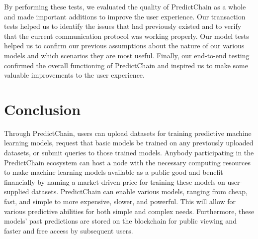\documentclass{ledger}
\begin{document}
By performing these tests, we evaluated the quality of PredictChain as a whole and made important additions to improve the user experience. Our transaction tests helped us to identify the issues that had previously existed and to verify that the current communication protocol was working properly. Our model tests helped us to confirm our previous assumptions about the nature of our various models and which scenarios they are most useful. Finally, our end-to-end testing confirmed the overall functioning of PredictChain and inspired us to make some valuable improvements to the user experience.



\section{Conclusion}

Through PredictChain, users can upload datasets for training predictive machine learning models, request that basic models be trained on any previously uploaded datasets, or submit queries to those trained models. Anybody participating in the PredictChain ecosystem can host a node with the necessary computing resources to make machine learning models available as a public good and benefit financially by naming a market-driven price for training these models on user-supplied datasets. PredictChain can enable various models, ranging from cheap, fast, and simple to more expensive, slower, and powerful. This will allow for various predictive abilities for both simple and complex needs. Furthermore, these models' past predictions are stored on the blockchain for public viewing and faster and free access by subsequent users.
\end{document}
